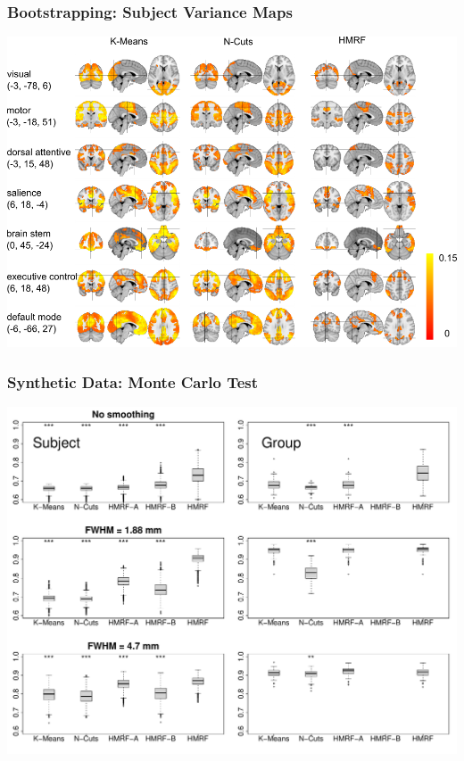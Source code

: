 \documentclass[sansserif, 10pt]{beamer}
\begin{document}
\begin{frame}
\frametitle{Bootstrapping: Subject Variance Maps}
\centering
\includegraphics[width = 1\textwidth]{sfig/sub_var}
\end{frame}

\begin{frame}
  \frametitle{Synthetic Data: Monte Carlo Test}
  \includegraphics[width = 1\textwidth]{sfig/2level_3smoothing}
\end{frame}
\end{document}
